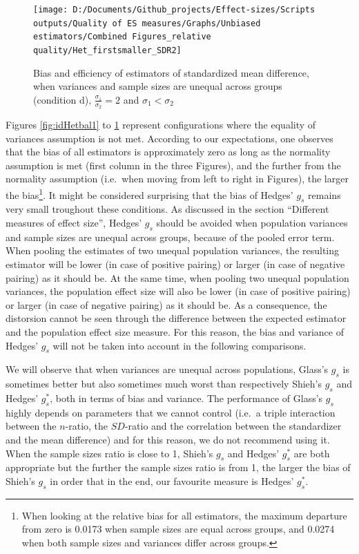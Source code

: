 \documentclass[
  english,
  man,floatsintext]{apa6}
\begin{document}
\begin{figure}

{\centering \texttt{[image: D:/Documents/Github\_projects/Effect-sizes/Scripts outputs/Quality of ES measures/Graphs/Unbiased estimators/Combined Figures\_relative quality/Het\_firstsmaller\_SDR2]} 

}

\caption{Bias and efficiency of estimators of standardized mean difference, when variances and sample sizes are unequal across groups (condition d), $\frac{\sigma_1}{\sigma_2}=2$ and $\sigma_1<\sigma_2$}\label{fig:idHetunbal4}
\end{figure}

Figures \ref{fig:idHetbal1} to \ref{fig:idHetunbal4} represent configurations where the equality of variances assumption is not met. According to our expectations, one observes that the bias of all estimators is approximately zero as long as the normality assumption is met (first column in the three Figures), and the further from the normality assumption (i.e.~when moving from left to right in Figures), the larger the bias\footnote{When looking at the relative bias for all estimators, the maximum departure from zero is 0.0173 when sample sizes are equal across groups, and 0.0274 when both sample sizes and variances differ across groups.}. It might be considered surprising that the bias of Hedges' \(g_s\) remains very small troughout these conditions. As discussed in the section \enquote{Different measures of effect size}, Hedges' \(g_s\) should be avoided when population variances and sample sizes are unequal across groups, because of the pooled error term. When pooling the estimates of two unequal population variances, the resulting estimator will be lower (in case of positive pairing) or larger (in case of negative pairing) as it should be. At the same time, when pooling two unequal population variances, the population effect size will also be lower (in case of positive pairing) or larger (in case of negative pairing) as it should be. As a consequence, the distorsion cannot be seen through the difference between the expected estimator and the population effect size measure. For this reason, the bias and variance of Hedges' \(g_s\) will not be taken into account in the following comparisons.

We will observe that when variances are unequal across populations, Glass's \(g_s\) is sometimes better but also sometimes much worst than respectively Shieh's \(g_s\) and Hedges' \(g^*_s\), both in terms of bias and variance. The performance of Glass's \(g_s\) highly depends on parameters that we cannot control (i.e.~a triple interaction between the \(n\)-ratio, the \(SD\)-ratio and the correlation between the standardizer and the mean difference) and for this reason, we do not recommend using it. When the sample sizes ratio is close to 1, Shieh's \(g_s\) and Hedges' \(g^*_s\) are both appropriate but the further the sample sizes ratio is from 1, the larger the bias of Shieh's \(g_s\) in order that in the end, our favourite measure is Hedges' \(g^*_s\).
\end{document}
